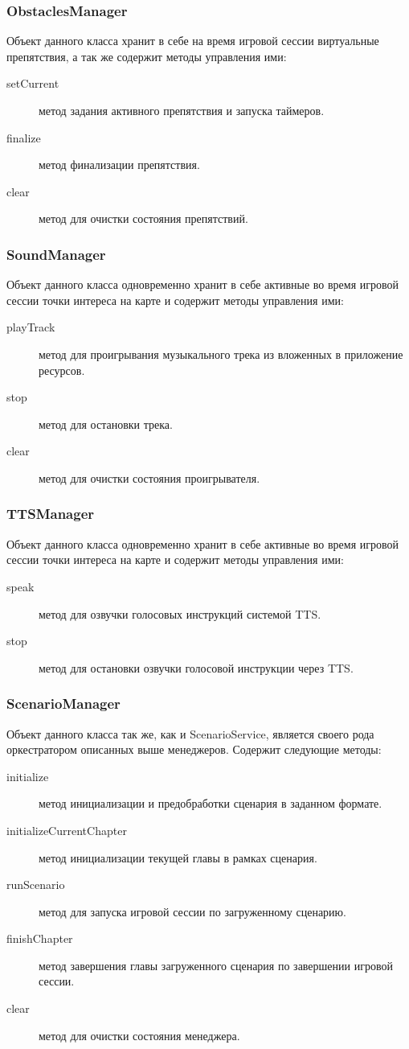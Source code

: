 \subsubsection*{ObstaclesManager}
Объект данного класса хранит в себе на время игровой сессии виртуальные препятствия, а так же содержит методы управления ими:
\begin{description}
	\item[setCurrent] метод задания активного препятствия и запуска таймеров.
	\item[finalize] метод финализации препятствия.
	\item[clear] метод для очистки состояния препятствий.
\end{description}

\subsubsection*{SoundManager}
Объект данного класса одновременно хранит в себе активные во время игровой сессии точки интереса на карте и содержит методы управления ими:
\begin{description}
	\item[playTrack] метод для проигрывания музыкального трека из вложенных в приложение ресурсов.
	\item[stop] метод для остановки трека.
	\item[clear] метод для очистки состояния проигрывателя.
\end{description}

\subsubsection*{TTSManager}
Объект данного класса одновременно хранит в себе активные во время игровой сессии точки интереса на карте и содержит методы управления ими:
\begin{description}
	\item[speak] метод для озвучки голосовых инструкций системой TTS.
	\item[stop] метод для остановки озвучки голосовой инструкции через TTS.
\end{description}

\subsubsection*{ScenarioManager}
Объект данного класса так же, как и ScenarioService, является своего рода оркестратором описанных выше менеджеров. 
Содержит следующие методы:
\begin{description}
	\item[initialize] метод инициализации и предобработки сценария в заданном формате.
	\item[initializeCurrentChapter] метод инициализации текущей главы в рамках сценария.
	\item[runScenario] метод для запуска игровой сессии по загруженному сценарию.
	\item[finishChapter] метод завершения главы загруженного сценария по завершении игровой сессии.
	\item[clear] метод для очистки состояния менеджера.
\end{description}


